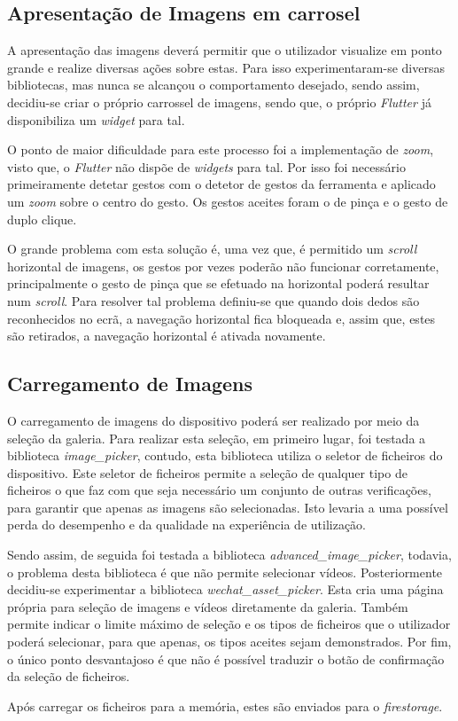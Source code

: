 \subsection{Apresentação de Imagens em carrosel}

A apresentação das imagens deverá permitir que o utilizador visualize em ponto grande e realize diversas ações sobre estas. Para isso experimentaram-se diversas bibliotecas, mas nunca se alcançou o comportamento desejado, sendo assim, decidiu-se criar o próprio carrossel de imagens, sendo que, o próprio \textit{Flutter} já disponibiliza um \textit{widget} para tal.

O ponto de maior dificuldade para este processo foi a implementação de \textit{zoom}, visto que, o \textit{Flutter} não dispõe de \textit{widgets} para tal. Por isso foi necessário primeiramente detetar gestos com o detetor de gestos da ferramenta e aplicado um \textit{zoom} sobre o centro do gesto. Os gestos aceites foram o de pinça e o gesto de duplo clique.

O grande problema com esta solução é, uma vez que, é permitido um \textit{scroll} horizontal de imagens, os gestos por vezes poderão não funcionar corretamente, principalmente o gesto de pinça que se efetuado na horizontal poderá resultar num \textit{scroll}. Para resolver tal problema definiu-se que quando dois dedos são reconhecidos no ecrã, a navegação horizontal fica bloqueada e, assim que, estes são retirados, a navegação horizontal é ativada novamente.

\subsection{Carregamento de Imagens}

O carregamento de imagens do dispositivo poderá ser realizado por meio da seleção da galeria. Para realizar esta seleção, em primeiro lugar, foi testada a biblioteca \textit{image\_picker}, contudo, esta biblioteca utiliza o seletor de ficheiros do dispositivo. Este seletor de ficheiros permite a seleção de qualquer tipo de ficheiros o que faz com que seja necessário um conjunto de outras verificações, para garantir que apenas as imagens são selecionadas. Isto levaria a uma possível perda do desempenho e da qualidade na experiência de utilização.

Sendo assim, de seguida foi testada a biblioteca \textit{advanced\_image\_picker}, todavia, o problema desta biblioteca é que não permite selecionar vídeos. Posteriormente decidiu-se experimentar a biblioteca \textit{wechat\_asset\_picker}. Esta cria uma página própria para seleção de imagens e vídeos diretamente da galeria. Também permite indicar o limite máximo de seleção e os tipos de ficheiros que o utilizador poderá selecionar, para que apenas, os tipos aceites sejam demonstrados. Por fim, o único ponto desvantajoso é que não é possível traduzir o botão de confirmação da seleção de ficheiros.

Após carregar os ficheiros para a memória, estes são enviados para o \textit{firestorage}.